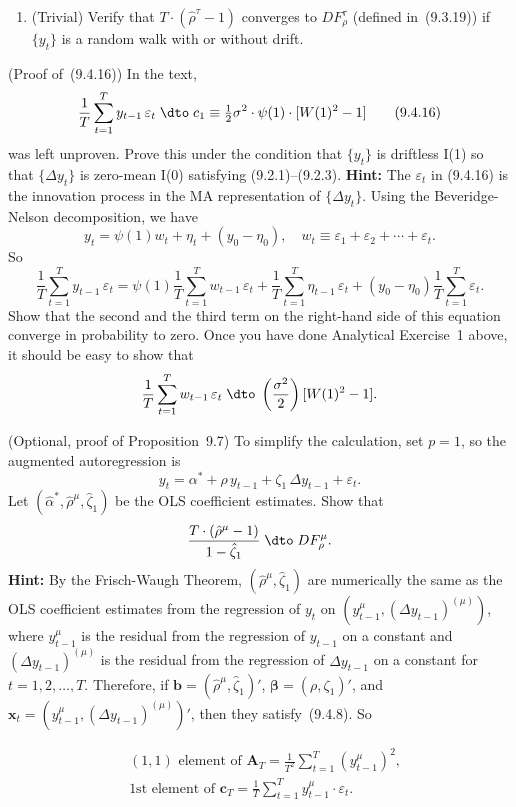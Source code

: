 \begin{problemset}
\begin{enumerate}[label=(\alph*)]
\item (Trivial) \enspace Verify that $T \cdot (\hat{\rho}^\tau - 1)$ converges to $DF_\rho^\tau$ (defined in~(9.3.19))
if $\{y_t\}$ is a random walk with or without drift.
\end{enumerate}

\exercise[4]
(Proof of~(9.4.16)) \enspace In the text,
\[
\frac{1}{T}\sum_{t=1}^{T} y_{t-1}\,\varepsilon_t
\;\dto\; c_1 \equiv \tfrac{1}{2}\sigma^2 \cdot \psi(1) \cdot [W(1)^2 - 1]
\tag{9.4.16}
\]
was left unproven. Prove this under the condition that $\{y_t\}$ is driftless I(1)
so that $\{\Delta y_t\}$ is zero-mean I(0) satisfying (9.2.1)--(9.2.3). \textbf{Hint:} The $\varepsilon_t$ in
(9.4.16) is the innovation process in the MA representation of $\{\Delta y_t\}$. Using
the Beveridge-Nelson decomposition, we have
\[
y_t = \psi(1)w_t + \eta_t + (y_0 - \eta_0), \quad w_t \equiv \varepsilon_1 + \varepsilon_2 + \cdots + \varepsilon_t.
\]
So
\[
\frac{1}{T}\sum_{t=1}^{T} y_{t-1}\,\varepsilon_t
= \psi(1)\frac{1}{T}\sum_{t=1}^{T} w_{t-1}\,\varepsilon_t
+ \frac{1}{T}\sum_{t=1}^{T}\eta_{t-1}\,\varepsilon_t
+ (y_0 - \eta_0)\frac{1}{T}\sum_{t=1}^{T}\varepsilon_t.
\tag{$*$}
\]
Show that the second and the third term on the right-hand side of this equation converge in probability to zero. Once you have done Analytical Exercise~1
above, it should be easy to show that
\[
\frac{1}{T}\sum_{t=1}^{T} w_{t-1}\,\varepsilon_t
\;\dto\; \left(\frac{\sigma^2}{2}\right)[W(1)^2 - 1].
\]

\exercise[5]
(Optional, proof of Proposition~9.7) \enspace To simplify the calculation, set $p = 1$, so
the augmented autoregression is
\[
y_t = \alpha^* + \rho\, y_{t-1} + \zeta_1\,\Delta y_{t-1} + \varepsilon_t.
\]
Let $(\hat{\alpha}^*, \hat{\rho}^\mu, \hat{\zeta}_1)$ be the OLS coefficient estimates. Show that
\[
\frac{T \cdot (\hat{\rho}^\mu - 1)}{1 - \hat{\zeta}_1}
\;\dto\; DF_\rho^\mu.
\]
\textbf{Hint:} By the Frisch-Waugh Theorem, $(\hat{\rho}^\mu, \hat{\zeta}_1)$ are numerically the same as the
OLS coefficient estimates from the regression of $y_t$ on $(y_{t-1}^\mu, (\Delta y_{t-1})^{(\mu)})$, where
$y_{t-1}^\mu$ is the residual from the regression of $y_{t-1}$ on a constant and $(\Delta y_{t-1})^{(\mu)}$ is
the residual from the regression of $\Delta y_{t-1}$ on a constant for $t = 1, 2, \ldots, T$.
Therefore, if $\mathbf{b} = (\hat{\rho}^\mu, \hat{\zeta}_1)'$, $\bm{\beta} = (\rho, \zeta_1)'$, and $\mathbf{x}_t = (y_{t-1}^\mu, (\Delta y_{t-1})^{(\mu)})'$, then
they satisfy~(9.4.8). So

\begin{align*}
&(1, 1) \text{ element of } \mathbf{A}_T = \frac{1}{T^2}\sum_{t=1}^{T}(y_{t-1}^\mu)^2, \\
&\text{1st element of } \mathbf{c}_T = \frac{1}{T}\sum_{t=1}^{T}y_{t-1}^\mu \cdot \varepsilon_t.
\end{align*}


\end{problemset}
